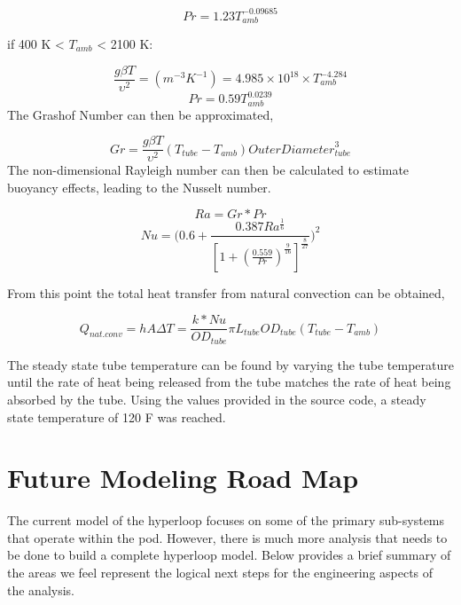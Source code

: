 \documentclass[heading.tex]{subfiles}
\begin{document}
\begin{equation*}
Pr = 1.23 T_{amb}^{-0.09685}
\end{equation*}

if 400 K <  $T_{amb}$ < 2100 K:


\begin{equation*}
\frac{g \beta T} {\upsilon^2}  = (m^{-3}K^{-1}) = 4.985\times10^{18} \times T_{amb}^{-4.284}
\end{equation*}
\begin{equation*}
Pr = 0.59 T_{amb}^{0.0239}
\end{equation*}
The Grashof Number can then be approximated,


\begin{equation*}
Gr = \frac{g \beta T} {\upsilon^2}  (T_{tube}-T_{amb}) {OuterDiameter}_{tube}^3
\end{equation*}
The non-dimensional Rayleigh number can then be calculated to estimate buoyancy effects, leading to the Nusselt number.


\begin{equation*}
Ra = Gr * Pr
\end{equation*}
\begin{equation*}
Nu = \Bigg(0.6 + \frac{0.387Ra^{\frac{1}{6}}}{[1+(\frac{0.559}{Pr})^{\frac{9}{16}}]^{\frac{8}{27}}}\Bigg)^2
\end{equation*}

From this point the total heat transfer from natural convection can be obtained,

\begin{equation*}
Q_{nat. conv} = hA \Delta T = \frac{k*Nu}{ {OD}_{tube}} \pi {L}_{tube} {OD}_{tube} (T_{tube}-T_{amb})
\end{equation*}

The steady state tube temperature can be found by varying the tube temperature until the rate of heat being released from the tube matches the rate of heat being absorbed by the tube. Using the values provided in the source code, a steady state temperature of 120 F was reached.


\section{Future Modeling Road Map}
The current model of the hyperloop focuses on some of the primary sub-systems that operate within the pod. However, there is much more analysis that needs to be done to build a complete hyperloop model. Below provides a brief summary of the areas we feel represent the logical next steps for the engineering aspects of the analysis.
\end{document}
